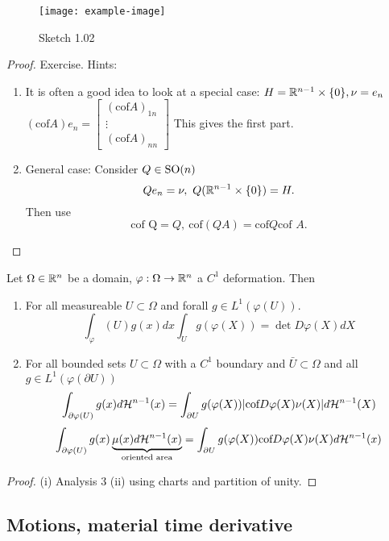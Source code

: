 \begin{figure}[H]\label{fig:1.02}
    \centering
    \texttt{[image: example-image]}
    \caption{Sketch 1.02}
\end{figure}

\begin{proof}
Exercise. Hints:
\begin{enumerate}
    \item It is often a good idea to look at a special case: \(H=\mathbb{R}^{n-1}\times \{0\},\nu=e_n\)
        \((\text{cof} A) e_n=\begin{bmatrix}
            (\text{cof} A)_{1n}\\ \vdots\\ (\text{cof} A)_{nn}
        \end{bmatrix}\) This gives the first part.
    \item General case: Consider \(Q\in {\text{SO}}(n)\) \[Qe_n=\nu, \ Q(\mathbb{R}^{n-1}\times \{0\})=H.\] Then use \[\text{cof Q}=Q,\ \text{cof}(QA)=\text{cof} Q\text{cof }A.\] 
\end{enumerate}    
\end{proof}

\begin{theorem}\label{thm:1.11}
    Let \(\Omega\in\mathbb{R}^n\) be a domain, \(\varphi:\Omega\to\mathbb{R}^n\) a \(C^1\) deformation. Then 
    \begin{enumerate}
        \item For all measureable \(U\subset\Omega\) and forall \(g\in L^1(\varphi(U))\). 
        \[\int_{\varphi}(U)g(x)dx\int_U g(\varphi(X))=\det D\varphi(X)dX\]
        \item For all bounded sets \(U\subset \Omega\) with a \(C^1\) boundary and \(\bar{U}\subset \Omega\) and all \(g\in L^1(\varphi(\partial U))\)
            \[\int_{\partial \varphi(U)}g(x)d\mathcal{H}^{n-1}(x)=\int_{\partial U} g(\varphi(X))|{\text{cof}} D\varphi(X)\nu(X)|d\mathcal{H}^{n-1}(X)\]
            \[\int_{\partial \varphi(U)}g(x)\underbrace{\mu(x)d\mathcal{H}^{n-1}(x)}_{\text{oriented area}}=\int_{\partial U}g(\varphi(X)){\text{cof}} D\varphi(X)\nu(X)d\mathcal{H}^{n-1}(x)\]
    \end{enumerate}
\end{theorem}

\begin{proof}
    (i) Analysis 3 (ii) using charts and partition of unity.
\end{proof}

\subsection{Motions, material time derivative}

